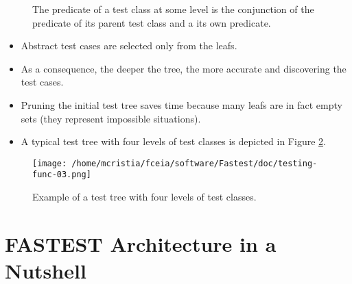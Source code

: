 \begin{figure}[h]
\setlength{\DTbaselineskip}{20pt}
\DTsetlength{1em}{3em}{0.1em}{1pt}{4pt}
\caption{\label{tcp}The predicate of a test class at some level is the conjunction of the predicate of its parent test class and a its own predicate.}
\end{figure}

\begin{itemize}

\item Abstract test cases are selected only from the leafs.

\item As a consequence, the deeper the tree, the more accurate and discovering the test cases.

\item Pruning the initial test tree saves time because many leafs are in fact empty sets (they represent impossible situations).


\item A typical test tree with four levels of test classes is depicted in Figure \ref{ttt}.

\end{itemize}

\begin{figure}
\begin{center}
\texttt{[image: /home/mcristia/fceia/software/Fastest/doc/testing-func-03.png]}
\caption{\label{ttt}Example of a test tree with four levels of test classes.}
\end{center}
\end{figure}

\pagebreak

\section{FASTEST Architecture in a Nutshell}

